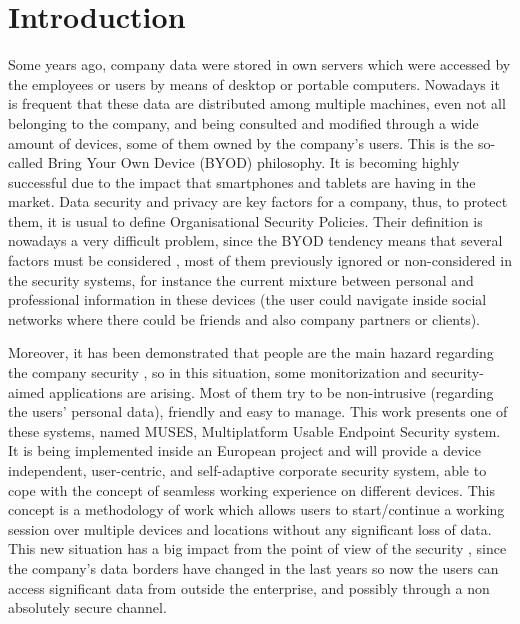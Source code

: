 \documentclass{sig-alternate}
\begin{document}


%
%
\section{Introduction}
\label{sec:intro}

Some years ago, company data were stored in own servers which were accessed by the employees or users by means of desktop or portable computers. Nowadays it is frequent that these data are distributed among multiple machines, even not all belonging to the company, and being consulted and modified through a wide amount of devices, some of them owned by the company's users. This is the so-called Bring Your Own Device (BYOD) philosophy. It is becoming highly successful due to the impact that smartphones and tablets are having in the market.
Data security and privacy are key factors for a company, thus, to protect them, it is usual to define Organisational Security Policies. Their definition is nowadays a very difficult problem, since the BYOD tendency means that several factors must be considered \cite{Opp_Security11}, most of them previously ignored or non-considered in the security systems, for instance the current mixture between personal and professional information in these devices (the user could navigate inside social networks where there could be friends and also company partners or clients).

Moreover, it has been demonstrated that people are the main hazard regarding the company security \cite{Adams_Users05}, so in this situation, some monitorization and security-aimed applications are arising. Most of them try to be non-intrusive (regarding the users' personal data), friendly and easy to manage.
This work presents one of these systems, named MUSES, Multiplatform Usable Endpoint Security system. It is being implemented inside an European project and will provide a device independent, user-centric, and self-adaptive corporate security system, able to cope with the concept of seamless working experience on different devices. This concept is a methodology of work which allows users to start/continue a working session over multiple devices and locations without any significant loss of data. This new situation has a big impact from the point of view of the security \cite{Schu_SecPatterns05}, since the company's data borders have changed in the last years so now the users can access significant data from outside the enterprise, and possibly through a non absolutely secure channel.
\end{document}
